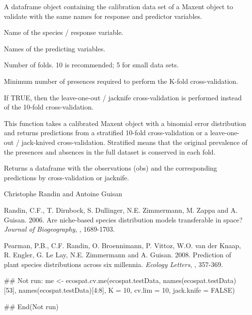 \documentclass[a4paper]{book}
\begin{document}
\begin{Arguments}
\begin{ldescription}
\item[\code{data.cv.me}] A dataframe object containing the calibration data set of a Maxent object to validate with the same names for response and predictor variables.
\item[\code{name.sp}] Name of the species / response variable.
\item[\code{names.pred}] Names of the predicting variables.
\item[\code{K}] Number of folds. 10 is recommended; 5 for small data sets.
\item[\code{cv.lim}] Minimum number of presences required to perform the K-fold cross-validation.
\item[\code{jack.knife}] If TRUE, then the leave-one-out / jacknife cross-validation is performed instead of the 10-fold cross-validation.
\end{ldescription}
\end{Arguments}
%
\begin{Details}\relax
This function takes a calibrated Maxent object with a binomial error distribution and returns predictions from a stratified 10-fold cross-validation or a leave-one-out / jack-knived cross-validation. Stratified means that the original prevalence of the presences and absences in the full dataset is conserved in each fold.
\end{Details}
%
\begin{Value}
Returns a dataframe with the observations (obs) and the corresponding predictions by cross-validation or jacknife.
\end{Value}
%
\begin{Author}\relax
Christophe Randin  and Antoine Guisan 
\end{Author}
%
\begin{References}\relax
Randin, C.F., T. Dirnbock, S. Dullinger, N.E. Zimmermann, M. Zappa and A. Guisan. 2006. Are niche-based species distribution models transferable in space? \emph{Journal of Biogeography}, , 1689-1703.


Pearman, P.B., C.F. Randin, O. Broennimann, P. Vittoz, W.O. van der Knaap, R. Engler, G. Le Lay, N.E. Zimmermann and A. Guisan. 2008. Prediction of plant species distributions across six millennia. \emph{Ecology Letters}, , 357-369.
\end{References}
%
\begin{Examples}
\begin{ExampleCode}

## Not run: 
me <- ecospat.cv.me(ecospat.testData, names(ecospat.testData)[53], 
names(ecospat.testData)[4:8], K = 10, cv.lim = 10, jack.knife = FALSE)

## End(Not run)
\end{ExampleCode}
\end{Examples}
\end{document}
